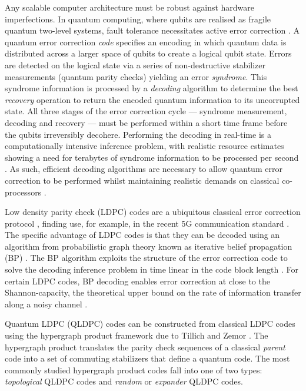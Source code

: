 \documentclass[%
 reprint,
superscriptaddress,
nofootinbib,
 amsmath,amssymb,
secnumarabic
]{revtex4-1}
\newcommand*{\etc}[1]{{#1}}
\begin{document}
Any scalable computer architecture must be robust against hardware imperfections. In quantum computing, where qubits are realised as fragile quantum two-level systems, fault tolerance necessitates active error correction \cite{Shor1995,Gottesman09,Devitt13,Terhal15,roffe2019quantum}. A quantum error correction \textit{code} specifies an encoding in which quantum data is distributed across a larger space of qubits to create a logical qubit state. Errors are detected on the logical state via a series of non-destructive stabilizer measurements (quantum parity checks) yielding an error \textit{syndrome}. This syndrome information is processed by a \textit{decoding} algorithm to determine the best \textit{recovery} operation to return the encoded quantum information to its uncorrupted state. All three stages of the error correction cycle --- syndrome measurement, decoding and recovery --- must be performed within a short time frame before the qubits irreversibly decohere. Performing the decoding in real-time is a computationally intensive inference problem, \etc{with realistic resource estimates showing a need for} terabytes of syndrome information to be processed per second \cite{delfosse2020}. As such, efficient decoding algorithms are necessary to allow quantum error correction to be performed whilst maintaining realistic demands on classical co-processors \cite{babar2015fifteen}.

Low density parity check (LDPC) codes are a ubiquitous classical error correction protocol \cite{gallager1962}, finding use, for example, in the recent 5G communication standard \cite{Bae2019}. The specific advantage of LDPC codes is that they can be decoded using an algorithm from probabilistic graph theory known as iterative belief propagation (BP) \cite{pearl1982reverend}. The BP algorithm exploits the structure of the error correction code to solve the decoding inference problem in time linear in the code block length \cite{kschischang2001factor}. For certain LDPC codes, BP decoding enables error correction at close to the Shannon-capacity, the theoretical upper bound on the rate of information transfer along a noisy channel \cite{shannon49,mackay1997near}.

Quantum LDPC (QLDPC) codes can be constructed from classical LDPC codes using the hypergraph product framework due to Tillich and Zemor \cite{tillich2013quantum}. The hypergraph product translates the parity check sequences of a classical \textit{parent} code into a set of commuting stabilizers that define a quantum code. \etc{The most commonly studied hypergraph product codes fall into one of two types}: \textit{topological} QLDPC codes and \textit{random} or \textit{expander} QLDPC codes.
\end{document}
